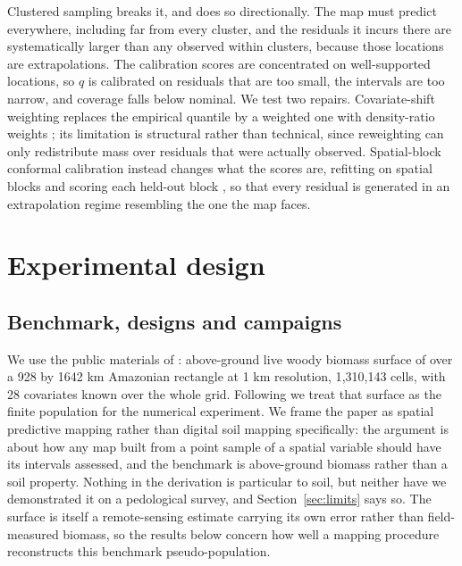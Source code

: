 \documentclass[preprint,12pt,authoryear]{elsarticle}
\begin{document}
Clustered sampling breaks it, and does so directionally. The map must predict
everywhere, including far from every cluster, and the residuals it incurs there
are systematically larger than any observed within clusters, because those
locations are extrapolations. The calibration scores are concentrated on
well-supported locations, so $q$ is calibrated on residuals that are too small,
the intervals are too narrow, and coverage falls below nominal. We test two
repairs. Covariate-shift weighting replaces the empirical quantile by a weighted
one with density-ratio weights \citep{tibshirani2019}; its limitation is
structural rather than technical, since reweighting can only redistribute mass
over residuals that were actually observed. Spatial-block conformal calibration
instead changes what the scores are, refitting on spatial blocks and scoring each
held-out block \citep{roberts2017}, so that every residual is generated in an
extrapolation regime resembling the one the map faces.

\section{Experimental design}
\label{sec:case}

\subsection{Benchmark, designs and campaigns}
\label{sec:designs}

We use the public materials of \citet{wadoux2021}: above-ground live woody
biomass surface of \citet{baccini2012} over a 928 by 1642 km Amazonian rectangle at 1 km
resolution, 1{,}310{,}143 cells, with 28 covariates known over the whole grid.
Following \citet{wadoux2021} we treat that surface as the finite population for
the numerical experiment. We frame the paper as spatial predictive mapping
rather than digital soil mapping specifically: the argument is about how any
map built from a point sample of a spatial variable should have its intervals
assessed, and the benchmark is above-ground biomass rather than a soil
property. Nothing in the derivation is particular to soil, but neither have we
demonstrated it on a pedological survey, and Section~\ref{sec:limits} says so. The surface is itself a remote-sensing
estimate carrying its own error rather than field-measured biomass, so the results below concern how well a
mapping procedure reconstructs this benchmark pseudo-population.
\end{document}
